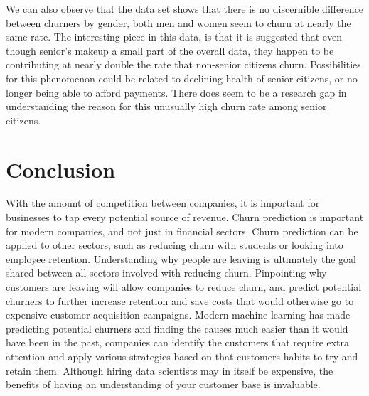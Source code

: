 \documentclass[12pt, a4paper]{article}
\begin{document}
We can also observe that the data set shows that there is no discernible difference between churners by gender, both men and women seem to churn at nearly the same rate. The interesting piece in this data, is that it is suggested that even though senior's makeup a small part of the overall data, they happen to be contributing at nearly double the rate that non-senior citizens churn. Possibilities for this phenomenon could be related to declining health of senior citizens, or no longer being able to afford payments. There does seem to be a research gap in understanding the reason for this unusually high churn rate among senior citizens.

\section{Conclusion}
With the amount of competition between companies, it is important for businesses to tap every potential source of revenue. Churn prediction is important for modern companies, and not just in financial sectors. Churn prediction can be applied to other sectors, such as reducing churn with students or looking into employee retention. Understanding why people are leaving is ultimately the goal shared between all sectors involved with reducing churn. Pinpointing why customers are leaving will allow companies to reduce churn, and predict potential churners to further increase retention and save costs that would otherwise go to expensive customer acquisition campaigns. Modern machine learning has made predicting potential churners and finding the causes much easier than it would have been in the past, companies can identify the customers that require extra attention and apply various strategies based on that customers habits to try and retain them. Although hiring data scientists may in itself be expensive, the benefits of having an understanding of your customer base is invaluable.\\


\end{document}

